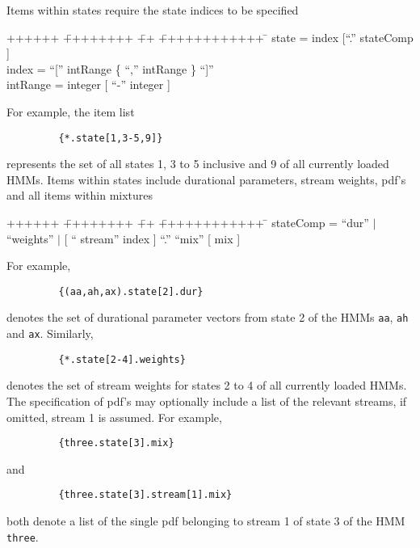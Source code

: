 Items within states require the state indices to be specified
{\sf
\begin{tabbing}
++++++ \= ++++++++ \= ++ \= ++++++++++++ \=  \kill
\>      state \>  = \> index [``.'' stateComp ] \\
\>      index \>  = \> ``['' intRange \{ ``,'' intRange \} ``]'' \\
\>    intRange \> = \> integer [ ``-'' integer ]
\end{tabbing}}
For example, the item list
\begin{verbatim}
         {*.state[1,3-5,9]}
\end{verbatim}
represents the set of all states 1, 3 to 5 inclusive and 9 of all
currently loaded HMMs.  Items within states include durational
parameters, stream weights, pdf's and all items within mixtures
{\sf
\begin{tabbing}
++++++ \= ++++++++ \= ++ \= ++++++++++++ \=  \kill
\>   stateComp \>  = \> ``dur'' $|$ ``weights'' $|$ [ `` stream'' index ]
        ``.'' ``mix'' [ mix ]
\end{tabbing}}
For example, 
\begin{verbatim}
         {(aa,ah,ax).state[2].dur}
\end{verbatim}
denotes the set of durational parameter vectors from state 2 of the
HMMs \texttt{aa}, \texttt{ah} and \texttt{ax}.  Similarly, 
\begin{verbatim}
         {*.state[2-4].weights}
\end{verbatim}
denotes the set of stream weights for states 2 to 4 of all currently
loaded HMMs.  The specification of pdf's may optionally include a
list of the relevant streams, if omitted, stream 1 is assumed.
For example,
\begin{verbatim}
         {three.state[3].mix}
\end{verbatim}
and
\begin{verbatim}
         {three.state[3].stream[1].mix}
\end{verbatim}
both denote a list of the single pdf belonging to stream 1 of state 3 
of the HMM \texttt{three}.

